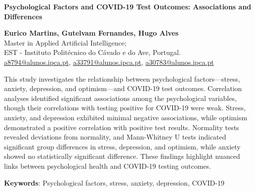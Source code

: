 \documentclass[a4paper]{article}
\title
\begin{document}
\noindent
\textbf{Psychological Factors and COVID-19 Test Outcomes: Associations and Differences}\\
\vspace{0.1em} 
\noindent\hrulefill 
\vspace{0.8em} 

\begin{center}
    \textbf{Eurico Martins, Gutelvam Fernandes, Hugo Alves}\\
    \vspace{0.5em}
    Master in Applied Artificial Intelligence;\\
		EST - Instituto Politécnico do Cávado e do Ave, Portugal.\\
    \vspace{0.5em}
    \href{mailto:a8794@alunos.ipca.pt}{a8794@alunos.ipca.pt}, \href{mailto:a33791@alunos.ipca.pt}{a33791@alunos.ipca.pt}, \href{mailto:a30783@alunos.ipca.pt}{a30783@alunos.ipca.pt}
\end{center}

\vspace{3em}
\vspace{1em}\newline
This study investigates the relationship between psychological factors—stress, anxiety, depression, and optimism—and COVID-19 test outcomes. Correlation analyses identified significant associations among the psychological variables, though their correlations with testing positive for COVID-19 were weak. Stress, anxiety, and depression exhibited minimal negative associations, while optimism demonstrated a positive correlation with positive test results. Normality tests revealed deviations from normality, and Mann-Whitney U tests indicated significant group differences in stress, depression, and optimism, while anxiety showed no statistically significant difference. These findings highlight nuanced links between psychological health and COVID-19 testing outcomes.

\vspace{1em}
\textbf{Keywords}: Psychological factors, stress, anxiety, depression, COVID-19

\vspace{2em}
\end{document}
